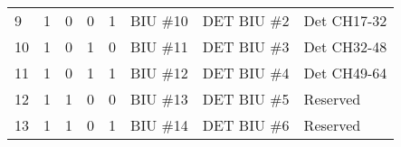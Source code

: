 \documentclass[]{article}
\begin{document}
\begin{table}[ht]
\begin{tabular}{llllllll}
			\rowcolor[HTML]{EFEFEF} 
			9            & 1              & 0              & 0              & 1              & BIU \#10                             & DET BIU \#2                           & \cellcolor[HTML]{EFEFEF}Det CH17-32                                                                                                                                                                                                                                                                                                                                              \\
			\rowcolor[HTML]{EFEFEF} 
			10           & 1              & 0              & 1              & 0              & BIU \#11                             & DET BIU \#3                           & \cellcolor[HTML]{EFEFEF}Det CH32-48                                                                                                                                                                                                                                                                                                                                              \\
			\rowcolor[HTML]{EFEFEF} 
			11           & 1              & 0              & 1              & 1              & BIU \#12                             & DET BIU \#4                           & \cellcolor[HTML]{EFEFEF}Det CH49-64                                                                                                                                                                                                                                                                                                                                              \\
			12           & 1              & 1              & 0              & 0              & BIU \#13                             & DET BIU \#5                           & Reserved                                                                                                                                                                                                                                                                                                                                                                         \\
			13           & 1              & 1              & 0              & 1              & BIU \#14                             & DET BIU \#6                           & Reserved                                                                                                                                                                                                                                                                                                                                                                         \\

\end{tabular}
\end{table}
\end{document}
